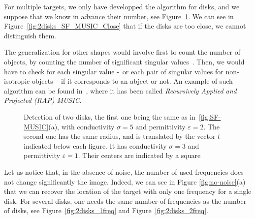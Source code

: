 For multiple targets, we only have developped the algorithm for disks, and we
suppose that we know in advance their number, see Figure~\ref{fig:2disks-SF-MUSIC}.
We can see in Figure~\ref{fig:2disks_SF_MUSIC_Close} that if the disks are too close, we cannot distinguish
them.

The generalization
for other shapes would involve first to count the number of objects, by counting
the number of significant singular values~\cite{ammari2004reconstruction}. Then,
we would have to check for each singular value -~or each pair of singular values for
non-isotropic objects~- if it corresponds to an abject or not. An example of such
algorithm can be found in~\cite{mosher1999source}, where it has been called
\emph{Recursively Applied and Projected (RAP) MUSIC}.

\begin{figure}[!h]
\centering%
\caption{Detection of two disks, the first one being the same as in~\ref{fig:SF-MUSIC}(a), with conductivity
$\sigma = 5$ and permittivity $\varepsilon = 2$. The second one has the same radius, and is translated by
the vector $t$ indicated below each figure. It has conductivity $\sigma = 3$ and permittivity
$\varepsilon = 1$. Their centers are indicated by a square
\label{fig:2disks-SF-MUSIC}}
\end{figure}

Let us notice that, in the absence of noise, the number of
used frequencies does not change  significantly the image. Indeed,
we can see in Figure \ref{fig:no-noise}(a) that we can recover the
location of the target  with only one frequency for a single disk. For several
disks, one needs the same number of frequencies as the number of disks, see
Figure~\ref{fig:2disks_1freq} and Figure~\ref{fig:2disks_2freq}.

